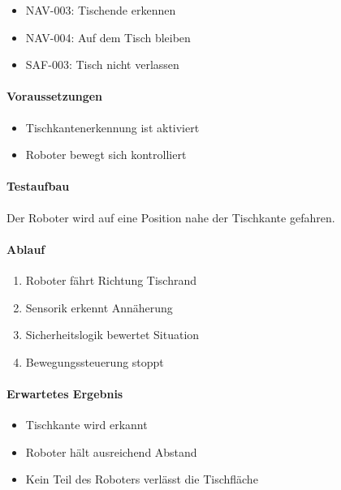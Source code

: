 \begin{itemize}
\tightlist
\item
  NAV-003: Tischende erkennen
\item
  NAV-004: Auf dem Tisch bleiben
\item
  SAF-003: Tisch nicht verlassen
\end{itemize}

\paragraph{Voraussetzungen}\label{voraussetzungen-26}

\begin{itemize}
\tightlist
\item
  Tischkantenerkennung ist aktiviert
\item
  Roboter bewegt sich kontrolliert
\end{itemize}

\paragraph{Testaufbau}\label{testaufbau-3}

Der Roboter wird auf eine Position nahe der Tischkante gefahren.

\paragraph{Ablauf}\label{ablauf-27}

\begin{enumerate}
\def\labelenumi{\arabic{enumi}.}
\tightlist
\item
  Roboter fährt Richtung Tischrand
\item
  Sensorik erkennt Annäherung
\item
  Sicherheitslogik bewertet Situation
\item
  Bewegungssteuerung stoppt
\end{enumerate}

\paragraph{Erwartetes Ergebnis}\label{erwartetes-ergebnis-27}

\begin{itemize}
\tightlist
\item
  Tischkante wird erkannt
\item
  Roboter hält ausreichend Abstand
\item
  Kein Teil des Roboters verlässt die Tischfläche
\end{itemize}

